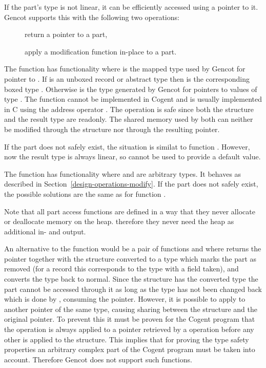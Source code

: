 If the part's type  is not linear, it can be efficiently accessed using a pointer to it.
Gencot supports this with the following two operations:
\begin{description}
  \item[] return a pointer to a part,
  \item[] apply a modification function in-place to a part.
\end{description}

The function  has functionality  where  is the mapped type used by Gencot
for pointer to . If  is an unboxed record or abstract type  then  is the
corresponding boxed type . Otherwise  is the type  generated by Gencot for pointers
to values of type . The function cannot be implemented in Cogent and is usually implemented in C using the address 
operator \code{\&}. The operation is safe since both the structure and the result type are readonly. The shared
memory used by both can neither be modified through the structure nor through the resulting pointer. 

If the part does not safely exist, the situation is similat to function . However, now the result 
type  is always linear, so  cannot be used to provide a default value.

The function  has functionality  where  and  are
arbitrary types. It behaves as described in Section~\ref{design-operations-modify}. If the part does not safely exist, 
the possible solutions are the same as for function .

Note that all part access functions are defined in a way that they never allocate or deallocate memory on the heap.
therefore they never need the heap as additional in- and output.

An alternative to the function  would be a pair of functions  and  where 
returns the pointer together with the structure converted to a type which marks the part as removed (for a record this
corresponds to the type with a field taken), and  converts the type back to normal. 
Since the structure has the converted type the part cannot be accessed through it
as long as the type has not been changed back which is done by , consuming the pointer.
However, it is possible to apply  to another pointer of the same type, causing sharing between the 
structure and the original pointer. To prevent this it must be proven for the Cogent program that the 
operation is always applied to a pointer retrieved by a  operation before any other 
is applied to the structure. This implies that
for proving the type safety properties an arbitrary complex part of the Cogent program must be taken into
account. Therefore Gencot does not support such functions.

